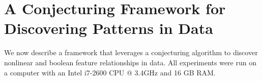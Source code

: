 \documentclass[ijds,nonblindrev]{informs-ijds}
\begin{document}




\section{A Conjecturing Framework for Discovering Patterns in Data}
\label{conjecturing}

We now describe a framework that leverages a conjecturing algorithm to discover nonlinear and boolean feature relationships in data.  All experiments were run on a computer with an Intel i7-2600 CPU @ 3.4GHz and 16 GB RAM.  


\end{document}
